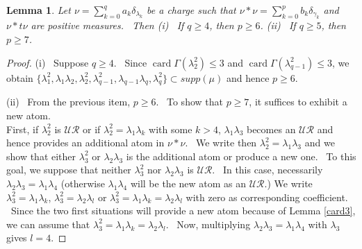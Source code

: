 \documentclass[10pt,a4paper]{amsart}
\newtheorem{lem}{Lemma}
\newcommand{\card}{\operatorname{card}}
\begin{document}
\begin{lem}\label{p4-5}
    Let $\nu=\sum_{k=0}^q a_k\delta_{\lambda_k}$ be a charge such that $\nu*\nu=\sum_{k=0}^p b_k \delta_{\gamma_k}$ and $\nu*t\nu$ are positive measures. \ Then \newline
    (i) \ If $q \ge 4$, then  $p\ge 6$. \newline
    (ii) \ If $q \ge 5$, then  $p\ge 7$.
\end{lem}

\begin{proof}
(i) \ Suppose  $q\ge 4$. \ Since  $\card\Gamma(\lambda^2_2)\le 3$ and $\card\Gamma(\lambda_{q-1}^2)\le 3$, we obtain 
$\{\lambda_1^2,\lambda_1\lambda_2,\lambda_2^2, \lambda_{q-1}^2,\lambda_{q-1}\lambda_q,\lambda_q^2\} \subset supp(\mu) $ and hence $p\ge 6$.

(ii) \ From the previous item, $p\ge 6$. \ To show that  $p\ge 7$, it suffices to exhibit a new atom.\\
First, if  $\lambda_2^2$ is $\mathcal{UR}$ or if $\lambda_2^2=\lambda_1\lambda_k$ with some $k>4$, $\lambda_1\lambda_3$  becomes an  $\mathcal{UR}$ and hence provides an additional atom in $\nu*\nu$. \ We write then
  $\lambda_2^2=\lambda_1\lambda_3$ and we show that either $\lambda_3^2$ or $\lambda_2\lambda_3$ is the additional atom or produce a new one. \ To this goal, we suppose that neither $\lambda_3^2$ nor  $\lambda_2\lambda_3$ is $\mathcal{UR}$. \ In this case, necessarily $\lambda_2\lambda_3=\lambda_1\lambda_4$ (otherwise   $\lambda_1\lambda_4$ will be the new atom as an $\mathcal{UR}$.)
We write $\lambda_3^2=\lambda_1\lambda_k$, $\lambda_3^2=\lambda_2\lambda_l$ or  $\lambda_3^2=\lambda_1\lambda_k=\lambda_2\lambda_l$ with zero as  corresponding coefficient. \ Since the two first situations will provide a new atom because of Lemma \ref{card3}, we can assume  that $\lambda_3^2=\lambda_1\lambda_k=\lambda_2\lambda_l$. \ Now, multiplying $\lambda_2\lambda_3=\lambda_1\lambda_4$   with $\lambda_3$ gives $l=4$. 


\end{proof}
\end{document}
